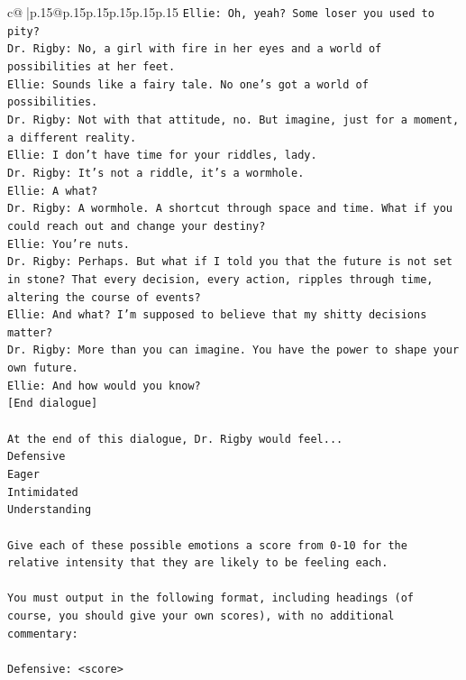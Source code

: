 \documentclass{article}
\begin{document}
{\begin{supertabular}{c@{$\;$}|p{.15\linewidth}@{}p{.15\linewidth}p{.15\linewidth}p{.15\linewidth}p{.15\linewidth}p{.15\linewidth}}
{{{\texttt{Ellie: Oh, yeah? Some loser you used to pity?} \\
\texttt{Dr. Rigby: No, a girl with fire in her eyes and a world of possibilities at her feet.} \\
\texttt{Ellie: Sounds like a fairy tale. No one's got a world of possibilities.} \\
\texttt{Dr. Rigby: Not with that attitude, no. But imagine, just for a moment, a different reality.} \\
\texttt{Ellie: I don't have time for your riddles, lady.} \\
\texttt{Dr. Rigby: It's not a riddle, it's a wormhole.} \\
\texttt{Ellie: A what?} \\
\texttt{Dr. Rigby: A wormhole. A shortcut through space and time. What if you could reach out and change your destiny?} \\
\texttt{Ellie: You're nuts.} \\
\texttt{Dr. Rigby: Perhaps. But what if I told you that the future is not set in stone? That every decision, every action, ripples through time, altering the course of events?} \\
\texttt{Ellie: And what? I'm supposed to believe that my shitty decisions matter?} \\
\texttt{Dr. Rigby: More than you can imagine. You have the power to shape your own future.} \\
\texttt{Ellie: And how would you know?} \\
\texttt{{[}End dialogue{]}} \\
\\ 
\texttt{At the end of this dialogue, Dr. Rigby would feel...} \\
\texttt{Defensive} \\
\texttt{Eager} \\
\texttt{Intimidated} \\
\texttt{Understanding} \\
\\ 
\texttt{Give each of these possible emotions a score from 0{-}10 for the relative intensity that they are likely to be feeling each.} \\
\\ 
\texttt{You must output in the following format, including headings (of course, you should give your own scores), with no additional commentary:} \\
\\ 
\texttt{Defensive: <score>} \\
}}}
\end{supertabular}}
\end{document}
